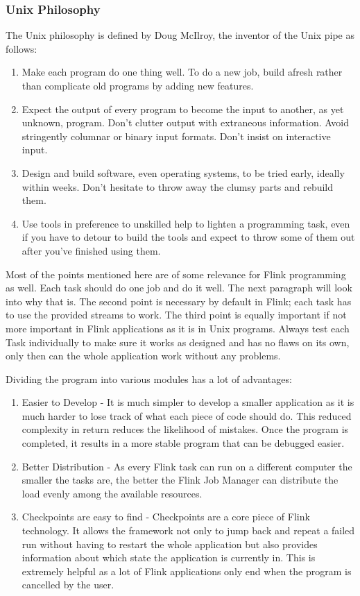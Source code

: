 \subsubsection{Unix Philosophy}
The Unix philosophy is defined by Doug McIlroy, the inventor of the Unix pipe as follows: \cite{bell1978}
\begin{enumerate}
  \item Make each program do one thing well. To do a new job, build afresh rather than complicate old programs by adding new features.
  \item Expect the output of every program to become the input to another, as yet unknown, program. Don't clutter output with extraneous information. Avoid stringently columnar or binary input formats. Don't insist on interactive input.
  \item Design and build software, even operating systems, to be tried early, ideally within weeks. Don't hesitate to throw away the clumsy parts and rebuild them.
  \item Use tools in preference to unskilled help to lighten a programming task, even if you have to detour to build the tools and expect to throw some of them out after you've finished using them.
\end{enumerate}

Most of the points mentioned here are of some relevance for Flink programming as well. Each task should do one job and do it well. The next paragraph will look into why that is. The second point is necessary by default in Flink; each task has to use the provided streams to work. The third point is equally important if not more important in Flink applications as it is in Unix programs. Always test each Task individually to make sure it works as designed and has no flaws on its own, only then can the whole application work without any problems.

Dividing the program into various modules has a lot of advantages:
\begin{enumerate}
  \item Easier to Develop - It is much simpler to develop a smaller application as it is much harder to lose track of what each piece of code should do. This reduced complexity in return reduces the likelihood of mistakes. Once the program is completed, it results in a more stable program that can be debugged easier.
  \item Better Distribution -  As every Flink task can run on a different computer the smaller the tasks are, the better the Flink Job Manager can distribute the load evenly among the available resources.
  \item Checkpoints are easy to find - Checkpoints are a core piece of Flink technology. It allows the framework not only to jump back and repeat a failed run without having to restart the whole application but also provides information about which state the application is currently in. This is extremely helpful as a lot of Flink applications only end when the program is cancelled by the user.
\end{enumerate}

